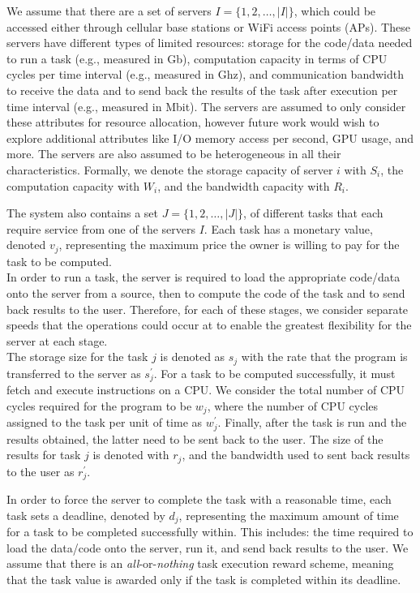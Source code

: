 We assume that there are a set of servers $I = \{1,2,\ldots,\left|I\right|\}$, which could be accessed either through
cellular base stations or WiFi access points (APs). These servers have different types of limited resources:
storage for the code/data needed to run a task (e.g., measured in Gb), computation capacity in terms of CPU cycles per
time interval (e.g., measured in Ghz), and communication bandwidth to receive the data and to send back the results
of the task after execution per time interval (e.g., measured in Mbit). The servers are assumed to only consider these
attributes for resource allocation, however future work would wish to explore additional attributes like I/O memory
access per second, GPU usage, and more. The servers are also assumed to be heterogeneous in all their characteristics.
Formally, we denote the storage capacity of server $i$ with $S_i$, the computation capacity with $W_i$, and the
bandwidth capacity with $R_i$.

The system also contains a set $J = \{1,2,\ldots,\left| J \right|\}$, of different tasks that each require service from
one of the servers $I$. Each task has a monetary value, denoted $v_j$, representing the maximum price the owner is
willing to pay for the task to be computed. \\
In order to run a task, the server is required to load the appropriate code/data onto the server from a source, then to
compute the code of the task and to send back results to the user. Therefore, for each of these stages, we consider
separate speeds that the operations could occur at to enable the greatest flexibility for the server at each stage. \\
The storage size for the task $j$ is denoted as $s_j$ with the rate that the program is transferred to the server
as $s^{'}_j$. For a task to be computed successfully, it must fetch and execute instructions on a CPU. We consider the
total number of CPU cycles required for the program to be $w_j$, where the number of CPU cycles assigned to the task
per unit of time as $w^{'}_j$. Finally, after the task is run and the results obtained, the latter need to be sent back
to the user. The size of the results for task $j$ is denoted with $r_j$, and the bandwidth used to sent back results to
the user as $r^{'}_j$.

In order to force the server to complete the task with a reasonable time, each task sets a deadline, denoted by $d_j$,
representing the maximum amount of time for a task to be completed successfully within. This includes: the time
required to load the data/code onto the server, run it, and send back results to the user. We assume that there
is an \emph{all}-or-\emph{nothing} task execution reward scheme, meaning that the task value is awarded only if the
task is completed within its deadline.


